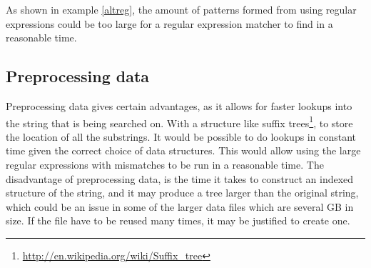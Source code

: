 As shown in example \ref{altreg}, the amount of patterns formed from using regular expressions could be too large for a regular expression matcher to find in a reasonable time. 

\subsection{Preprocessing data}
Preprocessing data gives certain advantages, as it allows for faster lookups into the string that is being searched on. With a structure like suffix trees\footnote{\url{http://en.wikipedia.org/wiki/Suffix_tree}}, to store the location of all the substrings. It would be possible to do lookups in constant time given the correct choice of data structures. This would allow using the large regular expressions with mismatches to be run in a reasonable time.
The disadvantage of preprocessing data, is the time it takes to construct an indexed structure of the string, and it may produce a tree larger than the original string, which could be an issue in some of the larger data files which are several GB in size. If the file have to be reused many times, it may be justified to create one. 